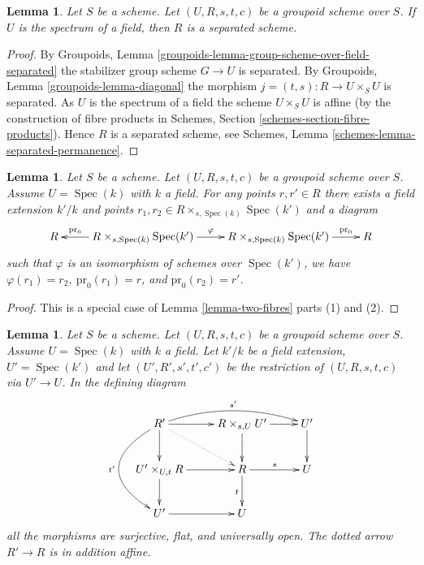 \documentclass{stacks-project}
\theoremstyle{plain}
\newtheorem{lemma}[subsection]{Lemma}
\theoremstyle{definition}
\theoremstyle{remark}
\numberwithin{equation}{subsection}
\def\Spec{\mathop{\mathrm{Spec}}}
\begin{document}
\begin{lemma}
\label{lemma-groupoid-on-field-separated}
Let $S$ be a scheme. Let $(U, R, s, t, c)$ be a groupoid scheme
over $S$. If $U$ is the spectrum of a field,
then $R$ is a separated scheme.
\end{lemma}

\begin{proof}
By
Groupoids, Lemma \ref{groupoids-lemma-group-scheme-over-field-separated}
the stabilizer group scheme $G \to U$ is separated. By
Groupoids, Lemma \ref{groupoids-lemma-diagonal}
the morphism $j = (t, s) : R \to U \times_S U$ is separated.
As $U$ is the spectrum of a field the scheme
$U \times_S U$ is affine (by the construction of fibre products in
Schemes, Section \ref{schemes-section-fibre-products}).
Hence $R$ is a separated scheme, see
Schemes, Lemma \ref{schemes-lemma-separated-permanence}.
\end{proof}

\begin{lemma}
\label{lemma-groupoid-on-field-homogeneous}
Let $S$ be a scheme. Let $(U, R, s, t, c)$ be a groupoid scheme
over $S$. Assume $U = \Spec(k)$ with $k$ a field.
For any points $r, r' \in R$ there exists a field extension
$k'/k$ and points
$r_1, r_2 \in R \times_{s, \Spec(k)} \Spec(k')$
and a diagram
$$
\xymatrix{
R &
R \times_{s, \Spec(k)} \Spec(k')
\ar[l]_-{\text{pr}_0} \ar[r]^\varphi &
R \times_{s, \Spec(k)} \Spec(k')
\ar[r]^-{\text{pr}_0} &
R
}
$$
such that $\varphi$ is an isomorphism of schemes over $\Spec(k')$,
we have $\varphi(r_1) = r_2$, $\text{pr}_0(r_1) = r$, and
$\text{pr}_0(r_2) = r'$.
\end{lemma}

\begin{proof}
This is a special case of
Lemma \ref{lemma-two-fibres}
parts (1) and (2).
\end{proof}

\begin{lemma}
\label{lemma-restrict-groupoid-on-field}
Let $S$ be a scheme. Let $(U, R, s, t, c)$ be a groupoid scheme
over $S$. Assume $U = \Spec(k)$ with $k$ a field.
Let $k'/k$ be a field extension, $U' = \Spec(k')$
and let $(U', R', s', t', c')$ be the restriction of
$(U, R, s, t, c)$ via $U' \to U$. In the defining diagram
$$
\xymatrix{
R' \ar[d] \ar[r] \ar@/_3pc/[dd]_{t'} \ar@/^1pc/[rr]^{s'} \ar@{..>}[rd] &
R \times_{s, U} U' \ar[r] \ar[d] &
U' \ar[d] \\
U' \times_{U, t} R \ar[d] \ar[r] &
R \ar[r]^s \ar[d]_t &
U \\
U' \ar[r] &
U
}
$$
all the morphisms are surjective, flat, and universally open.
The dotted arrow $R' \to R$ is in addition affine.
\end{lemma}
\end{document}
